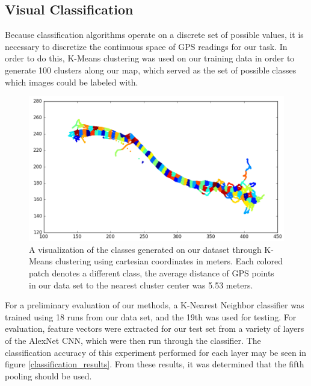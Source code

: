 \documentclass[letterpaper, 12 pt, conference]{ieeeconf}  %
\begin{document}
\subsection{Visual Classification}

Because classification algorithms operate on a discrete set of possible values, it is necessary to discretize the continuous space of GPS readings for our task. In order to do this, K-Means clustering was used on our training data in order to generate 100 clusters along our map, which served as the set of possible classes which images could be labeled with. 
\par 

\begin{figure}[h]
\centering
\includegraphics[scale=0.5]{clustering}
\caption{A visualization of the classes generated on our dataset through K-Means clustering using cartesian coordinates in meters. Each colored patch denotes a different class, the average distance of GPS points in our data set to the nearest cluster center was 5.53 meters.}
\label{clustering}
\end{figure}

For a preliminary evaluation of our methods, a K-Nearest Neighbor classifier was trained using 18 runs from our data set, and the 19th was used for testing. For evaluation, feature vectors were extracted for our test set from a variety of layers of the AlexNet CNN, which were then run through the classifier. The classification accuracy of this experiment performed for each layer may be seen in figure \ref{classification_results}. From these results, it was determined that the fifth pooling should be used.  
\end{document}
